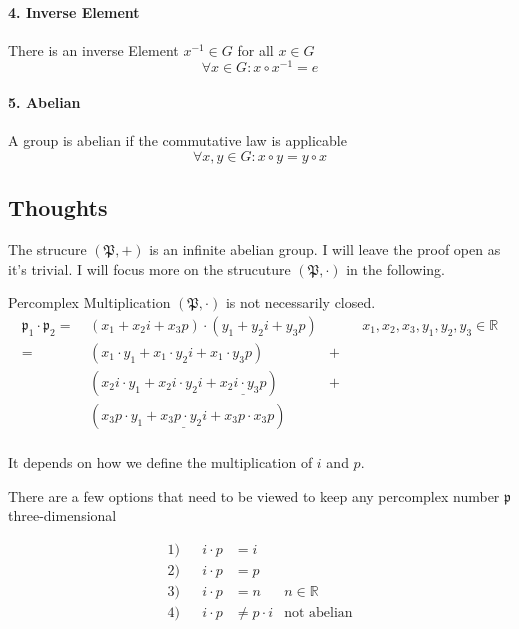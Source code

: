 \documentclass[a4paper,english,parskip]{scrartcl}
\begin{document}
\vspace{-10pt}
\paragraph{4. Inverse Element}
There is an inverse Element $x^{-1} \in G$ for all $x \in G$
\begin{equation*}
\forall x \in G : x \circ x^{-1} = e 
\end{equation*}

\vspace{-10pt}
\paragraph{5. Abelian}
A group is abelian if the commutative law is applicable
\begin{equation*}
\forall x,y \in G : x \circ y = y \circ x
\end{equation*}

\subsection{Thoughts}

The strucure $(\mathfrak{P}, +)$ is an infinite abelian group.
I will leave the proof open as it's trivial.
I will focus more on the strucuture $(\mathfrak{P}, \cdot)$ in the following.

Percomplex Multiplication $(\mathfrak{P}, \cdot)$ is not necessarily closed.
\begin{align*}
\mathfrak{p}_1 \cdot \mathfrak{p}_2 = \hspace{3pt} & (x_1 + x_2i +x_3p) \cdot (y_1 + y_2i + y_3p)
&&& x_1,x_2,x_3, y_1,y_2,y_3 \in \mathbb{R} \\
= \hspace{3pt} & (x_1 \cdot y_1 + x_1 \cdot y_2i + x_1 \cdot y_3p) &+ \\
& (x_2i \cdot y_1 + x_2i \cdot y_2i + \underline{x_2i \cdot y_3p}) &+ \\
& (x_3p \cdot y_1 + \underline{x_3p \cdot y_2i} + x_3p \cdot x_3p)  \\
\end{align*}

\vspace{-30pt}
It depends on how we define the multiplication of $i$ and $p$.

There are a few options that need to be viewed to keep any percomplex number $\mathfrak{p}$ three-dimensional

\begin{align*}
1) && i \cdot p &= i \\
2) && i \cdot p &= p \\
3) && i \cdot p &= n & n \in \mathbb{R} \\
4) && i \cdot p &\neq p \cdot i  & \text{not abelian}
\end{align*}
\end{document}
